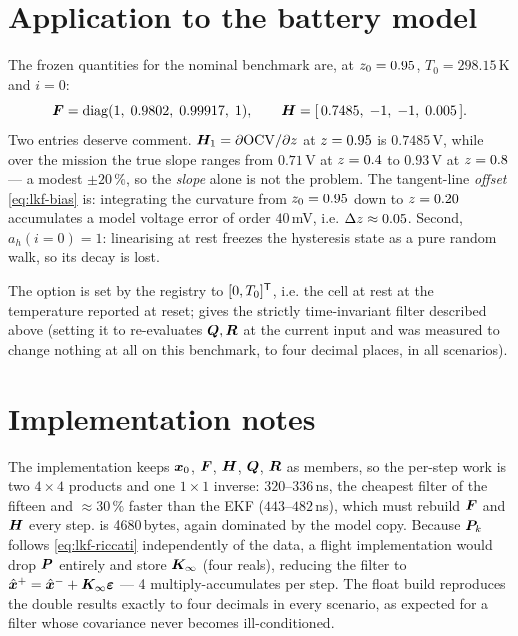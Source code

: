 \section{Application to the battery model}
The frozen quantities for the nominal benchmark are, at $z_0=0.95$, $T_0=298.15$\,K and
$i=0$:
\begin{equation}
\bm{F} = \operatorname{diag}(1,\;0.9802,\;0.99917,\;1), \qquad
\bm{H} = [\,0.7485,\;-1,\;-1,\;0.005\,].
\label{eq:lkf-battery}
\end{equation}
Two entries deserve comment. $\bm{H}_{1}=\partial\mathrm{OCV}/\partial z$ at $z=0.95$ is
$0.7485$\,V, while over the mission the true slope ranges from $0.71$\,V at $z=0.4$ to
$0.93$\,V at $z=0.8$ --- a modest $\pm 20\,\%$, so the \emph{slope} alone is not the
problem. The tangent-line \emph{offset} \eqref{eq:lkf-bias} is: integrating the curvature
from $z_0 = 0.95$ down to $z = 0.20$ accumulates a model voltage error of order
$40$\,mV, i.e. $\Delta z \approx 0.05$. Second, $a_h(i{=}0) = 1$: linearising at rest
freezes the hysteresis state as a pure random walk, so its decay is lost.

The  option is set by the registry to $[0, T_0]^{\mathsf{T}}$, i.e. the cell at rest at
the temperature reported at reset;  gives the strictly
time-invariant filter described above (setting it to  re-evaluates $\bm{Q},\bm{R}$ at
the current input and was measured to change nothing at all on this benchmark, to four
decimal places, in all scenarios).

\section{Implementation notes}
The implementation keeps $\bm{x}_0$, $\bm{F}$, $\bm{H}$, $\bm{Q}$, $\bm{R}$ as members, so the per-step work
is two $4\times4$ products and one $1\times1$ inverse: $320$--$336$\,ns, the cheapest filter of the
fifteen and $\approx 30\,\%$ faster than the EKF ($443$--$482$\,ns), which must rebuild $\bm{F}$
and $\bm{H}$ every step.  is 4680\,bytes, again dominated by the model copy.
Because $\bm{P}_k$ follows \eqref{eq:lkf-riccati} independently of the data, a flight
implementation would drop $\bm{P}$ entirely and store $\bm{K}_\infty$ (four reals), reducing the
filter to $\hat{\bm{x}}^{+} = \hat{\bm{x}}^{-} + \bm{K}_\infty \bm{\varepsilon}$ --- 4 multiply-accumulates per step. The
float build reproduces the double results exactly to four decimals in every scenario, as
expected for a filter whose covariance never becomes ill-conditioned.

